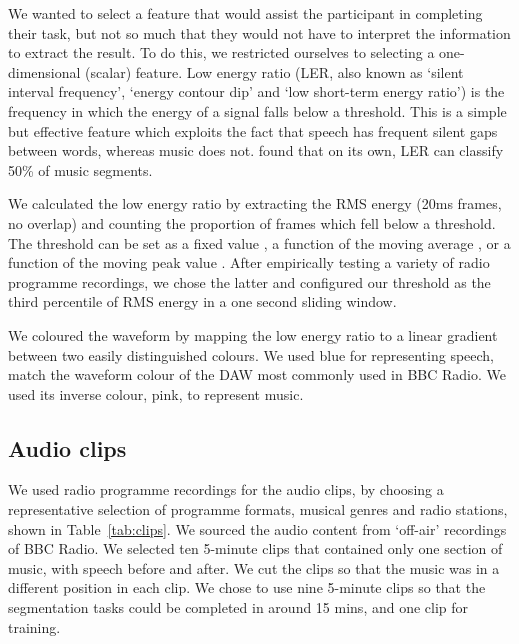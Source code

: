 We wanted to select a feature that would assist the participant in completing their task, but not so much that they
would not have to interpret the information to extract the result. To do this, we restricted ourselves to selecting a
one-dimensional (scalar) feature.
Low energy ratio (LER, also known as `silent interval frequency', `energy contour dip' and `low short-term energy
ratio') is the frequency in which the energy of a signal falls below a threshold. This is a simple but effective
feature which exploits the fact that speech has frequent silent gaps between words, whereas music does not.
\citet{Panagiotakis2005} found that on its own, LER can classify 50\% of music segments.

We calculated the low energy ratio by extracting the RMS energy (20ms frames, no overlap) and counting the proportion
of frames which fell below a threshold.  The threshold can be set as a fixed value \citep{Liang2005,Panagiotakis2005},
a function of the moving average \citep{Ericsson2009}, or a function of the moving peak value \citep{Saunders1996}.
After empirically testing a variety of radio programme recordings, we chose the latter and configured our threshold as
the third percentile of RMS energy in a one second sliding window.




We coloured the waveform by mapping the low energy ratio to a linear gradient between two easily distinguished colours.
We used blue for representing speech, match the waveform colour of the DAW most commonly used in BBC Radio. We used
its inverse colour, pink, to represent music.

\subsection{Audio clips}
We used radio programme recordings for the audio clips, by choosing a representative selection of programme formats,
musical genres and radio stations, shown in Table~\ref{tab:clips}.  We sourced the audio content from `off-air'
recordings of BBC Radio. We selected ten 5-minute clips that contained only one section of music, with speech before
and after. We cut the clips so that the music was in a different position in each clip.  We chose to use nine 5-minute
clips so that the segmentation tasks could be completed in around 15 mins, and one clip for training.

